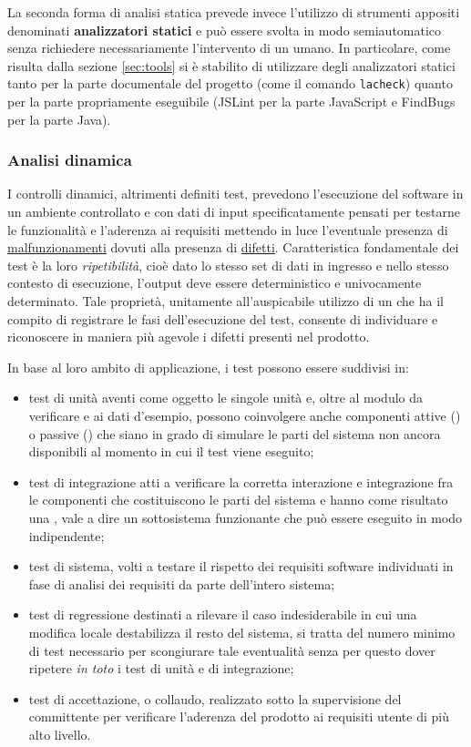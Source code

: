 {La seconda forma di analisi statica prevede invece l'utilizzo di strumenti appositi denominati \textbf{analizzatori statici} e può essere svolta in modo semiautomatico senza richiedere necessariamente l'intervento di un umano. In particolare, come risulta dalla sezione \ref{sec:tools} si è stabilito di utilizzare degli analizzatori statici tanto per la parte documentale del progetto (come il comando \texttt{lacheck}) quanto per la parte propriamente eseguibile (JSLint per la parte JavaScript e FindBugs per la parte Java).

\subsubsection{Analisi dinamica}
I controlli dinamici, altrimenti definiti test, prevedono l'esecuzione del software in un ambiente controllato e con dati di input specificatamente pensati per testarne le funzionalità e l'aderenza ai requisiti mettendo in luce l'eventuale presenza di \underline{malfunzionamenti} dovuti alla presenza di \underline{difetti}. Caratteristica fondamentale dei test è la loro \emph{ripetibilità}, cioè dato lo stesso set di dati in ingresso e nello stesso contesto di esecuzione, l'output deve essere deterministico e univocamente determinato. Tale proprietà, unitamente all'auspicabile utilizzo di un  che ha il compito di registrare le fasi dell'esecuzione del test, consente di individuare e riconoscere in maniera più agevole i difetti presenti nel prodotto.

In base al loro ambito di applicazione, i test possono essere suddivisi in:
\begin{itemize}
  \item test di unità aventi come oggetto le singole unità e, oltre al modulo da verificare e ai dati d'esempio, possono coinvolgere anche componenti attive () o passive () che siano in grado di simulare le parti del sistema non ancora disponibili al momento in cui il test viene eseguito;
  \item test di integrazione atti a verificare la corretta interazione e integrazione fra le componenti che costituiscono le parti del sistema e hanno come risultato una , vale a dire un sottosistema funzionante che può essere eseguito in modo indipendente;
  \item test di sistema, volti a testare il rispetto dei requisiti software individuati in fase di analisi dei requisiti da parte dell'intero sistema; 
  \item test di regressione destinati a rilevare il caso indesiderabile in cui una modifica locale destabilizza il resto del sistema, si tratta del numero minimo di test necessario per scongiurare tale eventualità senza per questo dover ripetere \emph{in toto} i test di unità e di integrazione;
  \item test di accettazione, o collaudo, realizzato sotto la supervisione del committente per verificare l'aderenza del prodotto ai requisiti utente di più alto livello.
\end{itemize}

}
